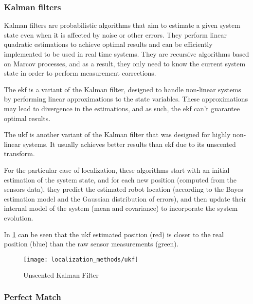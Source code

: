 \subsubsection{Kalman filters}

Kalman filters \cite{Kalman1960} are probabilistic algorithms that aim to estimate a given system state even when it is affected by noise or other errors. They perform linear quadratic estimations to achieve optimal results and can be efficiently implemented to be used in real time systems. They are recursive algorithms based on Marcov processes, and as a result, they only need to know the current system state in order to perform measurement corrections.

The \gls{ekf} \cite{Einicke1999,Ribeiro2004,Ivanjko2010,Liu2011} is a variant of the Kalman filter, designed to handle non-linear systems by performing linear approximations to the state variables. These approximations may lead to divergence in the estimations, and as such, the \gls{ekf} can't guarantee optimal results.

The \gls{ukf} \cite{Julier1997,Wan2002} is another variant of the Kalman filter that was designed for highly non-linear systems. It usually achieves better results than \gls{ekf} due to its unscented transform.

For the particular case of localization, these algorithms start with an initial estimation of the system state, and for each new position (computed from the sensors data), they predict the estimated robot location (according to the Bayes estimation model and the Gaussian distribution of errors), and then update their internal model of the system (mean and covariance) to incorporate the system evolution.

In \cref{fig:localization-methods_ukf} can be seen that the \gls{ukf} estimated position (red) is closer to the real position (blue) than the raw sensor measurements (green).

\begin{figure}[H]
	\centering
	\texttt{[image: localization\_methods/ukf]}
	\caption{Unscented Kalman Filter\protect\footnotemark}
	\label{fig:localization-methods_ukf}
\end{figure}


\subsubsection{Perfect Match}

